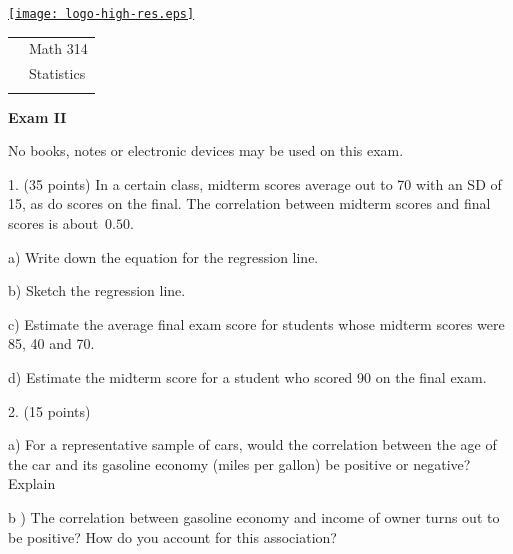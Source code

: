 \documentclass[10pt]{article}
\begin{document}
\vfill
\eject

\pagestyle{empty}

\href{http://www.shepherd.edu}{\texttt{[image: logo-high-res.eps]}}
\vspace{-1.69cm}

{\small
\begin{tabular}{cl}
& Math 314\\
& Statistics\\
\hspace{5.28in} & %
\end{tabular}
}

\begin{center}
\textbf{\large  Exam II}
\end{center}
No books, notes or electronic devices may be used on this exam.
\medskip

1. (35 points) In a certain class, midterm scores average out to 70 with an SD of 15, as do 
scores on the final.  The correlation between midterm scores and final scores is 
about~$0.50$.   

\hspace{20pt} a) Write down the equation for the regression line. %
\vspace{1.0in}

\hspace{20pt} b) Sketch the regression line. %
\vspace{1.25in}

\hspace{20pt} c) 
Estimate the average final exam score for students whose midterm scores were
85, 40 and 70. %
\vspace{2.75in}

\hspace{20pt} d) Estimate the midterm score for a student who scored 90 on the final exam.
\vfill
\eject
{\ }


2. (15 points) 

\hspace{20pt} a) For a representative sample of cars, would the correlation between the
age of the car and its gasoline economy (miles per gallon) be positive or negative?  Explain
\vspace{1.75in}

\hspace{20pt} b ) The correlation between gasoline economy and income of owner turns out to 
be positive?  How do you account for this association?
\vspace{2in}
\end{document}
